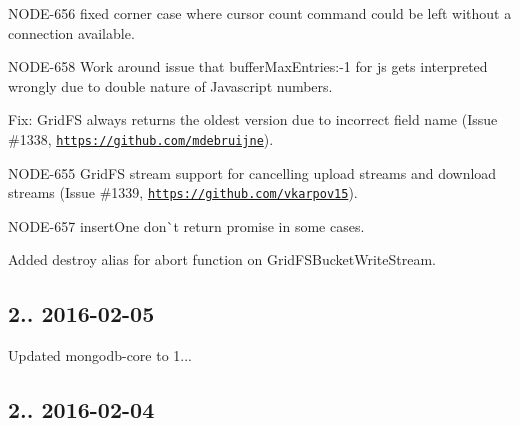\begin{DoxyItemize}
\item N\+O\+D\+E-\/656 fixed corner case where cursor count command could be left without a connection available.
\item N\+O\+D\+E-\/658 Work around issue that buffer\+Max\+Entries\+:-\/1 for js gets interpreted wrongly due to double nature of Javascript numbers.
\item Fix\+: Grid\+FS always returns the oldest version due to incorrect field name (Issue \#1338, \href{https://github.com/mdebruijne}{\tt https\+://github.\+com/mdebruijne}).
\item N\+O\+D\+E-\/655 Grid\+FS stream support for cancelling upload streams and download streams (Issue \#1339, \href{https://github.com/vkarpov15}{\tt https\+://github.\+com/vkarpov15}).
\item N\+O\+D\+E-\/657 insert\+One don\`{}t return promise in some cases.
\item Added destroy alias for abort function on Grid\+F\+S\+Bucket\+Write\+Stream.
\end{DoxyItemize}

\subsection*{2.. 2016-\/02-\/05 }


\begin{DoxyItemize}
\item Updated mongodb-\/core to 1...
\end{DoxyItemize}

\subsection*{2.. 2016-\/02-\/04 }


